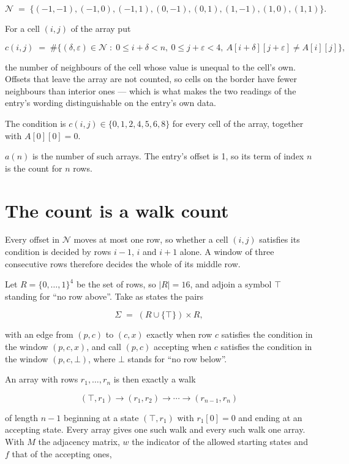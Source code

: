 \documentclass[11pt]{article}
\theoremstyle{definition}
\begin{document}
\[\mathcal{N} \;=\; \{(-1,-1), (-1,0), (-1,1), (0,-1), (0,1), (1,-1), (1,0), (1,1)\}.\]

For a cell $(i,j)$ of the array put

\[c(i,j) \;=\; \#\bigl\{(\delta,\varepsilon)\in\mathcal{N} \;:\; 0\le i+\delta<n,\ 0\le j+\varepsilon<4,\ A[i+\delta][j+\varepsilon] \neq A[i][j]\bigr\},\]

the number of neighbours of the cell whose value is unequal to the cell's own. Offsets that leave the array are not counted, so cells on the border have fewer neighbours than interior ones --- which is what makes the two readings of the entry's wording distinguishable on the entry's own data.

The condition is $c(i,j) \in \{0, 1, 2, 4, 5, 6, 8\}$ for every cell of the array, together with $A[0][0]=0$.

$a(n)$ is the number of such arrays. The entry's offset is 1, so its term of index $n$ is the count for $n$ rows.

\section{The count is a walk count}

Every offset in $\mathcal{N}$ moves at most one row, so whether a cell $(i,j)$ satisfies its condition is decided by rows $i-1$, $i$ and $i+1$ alone. A window of three consecutive rows therefore decides the whole of its middle row.

Let $R = \{0,\dots,1\}^{4}$ be the set of rows, so $|R| = 16$, and adjoin a symbol $\top$ standing for ``no row above''. Take as states the pairs

\[\Sigma \;=\; (R \cup \{\top\}) \times R,\]

with an edge from $(p,c)$ to $(c,x)$ exactly when row $c$ satisfies the condition in the window $(p,c,x)$, and call $(p,c)$ accepting when $c$ satisfies the condition in the window $(p,c,\bot)$, where $\bot$ stands for ``no row below''.

An array with rows $r_1,\dots,r_n$ is then exactly a walk

\[(\top,r_1) \to (r_1,r_2) \to \cdots \to (r_{n-1},r_n)\]

of length $n-1$ beginning at a state $(\top,r_1)$ with $r_1[0]=0$ and ending at an accepting state. Every array gives one such walk and every such walk one array. With $M$ the adjacency matrix, $w$ the indicator of the allowed starting states and $f$ that of the accepting ones,
\end{document}
